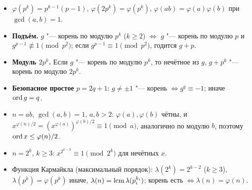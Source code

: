 \documentclass{ca-handout}
\begin{document}
\begin{itemize}
  \item $\varphi(p^k) = p^{k-1}(p - 1)$, $\varphi(2p^k) = \varphi(p^k)$,
    $\varphi(ab) = \varphi(a)\varphi(b)$ при $\gcd(a, b) = 1$.
  \item \textbf{Подъём.} $g$ "--- корень по модулю $p^k$ ($k \ge 2$) $\iff$ $g$ "--- корень по
    модулю $p$ и $g^{p-1} \not\equiv 1 \pmod{p^2}$; если $g^{p-1} \equiv 1 \pmod{p^2}$, годится
    $g + p$.
  \item \textbf{Модуль $2p^k$.} Если $g$ "--- корень по модулю $p^k$, то нечётное из $g$,
    $g + p^k$ "--- корень по модулю $2p^k$.
  \item \textbf{Безопасное простое} $p = 2q + 1$: $g \ne \pm 1$ "--- корень $\iff
    g^q \equiv -1$; иначе $\operatorname{ord} g = q$.
\end{itemize}

\begin{reminder}[title={Модули без первообразных корней}]
\begin{itemize}
  \item $n = ab$, $\gcd(a, b) = 1$, $a, b > 2$: $\varphi(a), \varphi(b)$ чётны, и
    $x^{\varphi(n)/2} = (x^{\varphi(a)})^{\varphi(b)/2} \equiv 1 \pmod a$, аналогично по
    модулю $b$, поэтому $\operatorname{ord} x \le \varphi(n)/2$.
  \item $n = 2^k$, $k \ge 3$: $x^{2^{k-2}} \equiv 1 \pmod{2^k}$ для нечётных $x$.
  \item Функция Кармайкла (максимальный порядок): $\lambda(2^k) = 2^{k-2}$ ($k \ge 3$),
    $\lambda(p^k) = \varphi(p^k)$ иначе, $\lambda(n) = \operatorname{lcm} \lambda(p_i^{k_i})$; корень есть
    $\iff \lambda(n) = \varphi(n)$.
\end{itemize}
\end{reminder}
\end{document}
